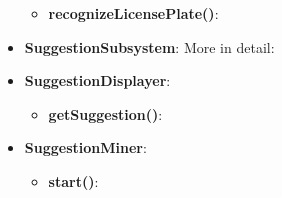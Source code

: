 \documentclass{article}
\begin{document}
\begin{itemize}
		\begin{itemize}
			\item \textbf{recognizeLicensePlate()}:
		\end{itemize}
	\item \textbf{SuggestionSubsystem}: More in detail:
	\item \textbf{SuggestionDisplayer}:
		\begin{itemize}
			\item \textbf{getSuggestion()}:
		\end{itemize}
	\item \textbf{SuggestionMiner}:
		\begin{itemize}
			\item \textbf{start()}:
		\end{itemize}
\end{itemize}

\newpage
\end{document}
